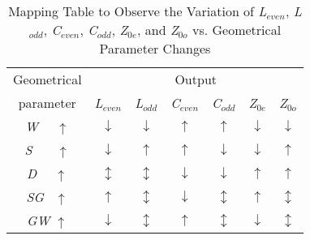 \documentclass[journal]{IEEEtran}
\begin{document}
\begin{table}
	\centering
	\caption{Mapping Table to Observe the Variation of \textit{L$_{even}$}, \textit{L$_{odd}$}, \textit{C$_{even}$}, \textit{C$_{odd}$}, \textit{Z$_{0e}$}, and \textit{Z$_{0o}$} vs. Geometrical Parameter Changes}
	\label{table:mapping} %
	\begin{tabular}{ |c|c|c|c|c|c|c| }
		\hline
		\multirow{1}{*}{Geometrical } & \multicolumn{6}{|c|}{Output} \\  \cline{2-7}
		parameter& \textit{L$_{even}$} & \textit{L$_{odd}$} & \textit{C$_{even}$} & \textit{C$_{odd}$} & \textit{Z$_{0e}$} & \textit{Z$_{0o}$} \\ %
		\hline
		\textit{W~~}   $\uparrow$ & $\downarrow$  & $\downarrow$ & $\uparrow$ & $\uparrow$ & $\downarrow$ & $\downarrow$ \\
		\hline
		\textit{S~~~}   $\uparrow$ & $\downarrow$ & $\uparrow$ & $\uparrow$ & $\downarrow$ & $\downarrow$ & $\uparrow$ \\
		\hline
		\textit{D~~} $\uparrow$ & $\updownarrow$ & $\updownarrow$ & $\downarrow$ & $\downarrow$ & $\uparrow$ & $\uparrow$\\
		\hline
		\textit{SG~} $\uparrow$ & $\uparrow$ & $\updownarrow$ & $\downarrow$ & $\updownarrow$ & $\uparrow$ & $\updownarrow$\\
		\hline
		\textit{GW} $\uparrow$ & $\downarrow$  & $\updownarrow$ & $\uparrow$ & $\updownarrow$ & $\downarrow$ & $\updownarrow$\\
		\hline
	\end{tabular}
\end{table}
\end{document}
